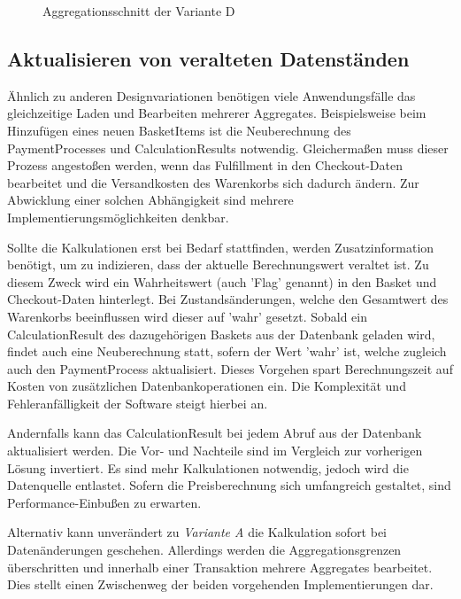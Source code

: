 \begin{figure}[htbp]
	\centering
	
	\caption{Aggregationsschnitt der Variante D}
	\label{fig:VarD}
\end{figure}

\subsection{Aktualisieren von veralteten Datenständen}

Ähnlich zu anderen Designvariationen benötigen viele Anwendungsfälle das gleichzeitige Laden und Bearbeiten mehrerer Aggregates. Beispielsweise beim Hinzufügen eines neuen BasketItems ist die Neuberechnung des PaymentProcesses und CalculationResults notwendig. Gleichermaßen muss dieser Prozess angestoßen werden, wenn das Fulfillment in den Checkout-Daten bearbeitet und die Versandkosten des Warenkorbs sich dadurch ändern. Zur Abwicklung einer solchen Abhängigkeit sind mehrere Implementierungsmöglichkeiten denkbar.

Sollte die Kalkulationen erst bei Bedarf stattfinden, werden Zusatzinformation benötigt, um zu indizieren, dass der aktuelle Berechnungswert veraltet ist. Zu diesem Zweck wird ein Wahrheitswert (auch 'Flag' genannt) in den Basket und Checkout-Daten hinterlegt. Bei Zustandsänderungen, welche den Gesamtwert des Warenkorbs beeinflussen wird dieser auf 'wahr' gesetzt. Sobald ein CalculationResult des dazugehörigen Baskets aus der Datenbank geladen wird, findet auch eine Neuberechnung statt, sofern der Wert 'wahr' ist, welche zugleich auch den PaymentProcess aktualisiert. Dieses Vorgehen spart Berechnungszeit auf Kosten von zusätzlichen Datenbankoperationen ein. Die Komplexität und Fehleranfälligkeit der Software steigt hierbei an.

Andernfalls kann das CalculationResult bei jedem Abruf aus der Datenbank aktualisiert werden. Die Vor- und Nachteile sind im Vergleich zur vorherigen Lösung invertiert. Es sind mehr Kalkulationen notwendig, jedoch wird die Datenquelle entlastet. Sofern die Preisberechnung sich umfangreich gestaltet, sind Performance-Einbußen zu erwarten.

Alternativ kann unverändert zu \emph{Variante A} die Kalkulation sofort bei Datenänderungen geschehen. Allerdings werden die Aggregationsgrenzen überschritten und innerhalb einer Transaktion mehrere Aggregates bearbeitet. Dies stellt einen Zwischenweg der beiden vorgehenden Implementierungen dar.

